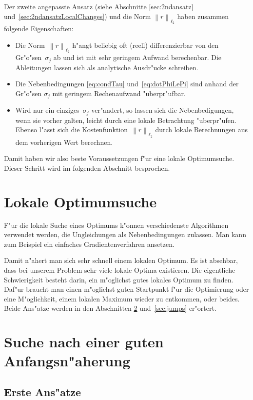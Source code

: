 \documentclass[a4paper]{scrartcl}
\newcommand{\norm}[1]{{\left\lVert#1\right\rVert}}
\begin{document}
Der zweite angepasste Ansatz (siehe Abschnitte \ref{sec:2ndansatz} und~\ref{sec:2ndansatzLocalChanges}) und die Norm $\norm{r}_{\ell_2}$ haben zusammen folgende Eigenschaften:
\begin{itemize}
  \item Die Norm~$\norm{r}_{\ell_2}$ h"angt beliebig oft (reell) differenzierbar von den Gr"o"sen~$\sigma_j$ ab und ist mit sehr geringem Aufwand berechenbar. 
  Die Ableitungen lassen sich als analytische Ausdr"ucke schreiben.
  \item Die Nebenbedingungen \eqref{eq:condTau} und~\eqref{eq:dotPhiLePi} sind anhand der Gr"o"sen $\sigma_j$ mit geringem Rechenaufwand "uberpr"ufbar. 
  \item Wird nur ein einziges~$\sigma_j$ ver"andert, so lassen sich die Nebenbedigungen, wenn sie vorher galten, leicht durch eine lokale Betrachtung "uberpr"ufen. 
  Ebenso l"asst sich die Kostenfunktion~$\norm{r}_{\ell_2}$ durch lokale Berechnungen aus dem vorherigen Wert berechnen. 
\end{itemize}
Damit haben wir also beste Voraussetzungen f"ur eine lokale Optimumsuche. 
Dieser Schritt wird im folgenden Abschnitt besprochen. 


\section{Lokale Optimumsuche} \label{sec:gradients}

F"ur die lokale Suche eines Optimums k"onnen verschiedenste Algorithmen verwendet werden, die Ungleichungen als Nebenbedingungen zulassen. 
Man kann zum Beispiel ein einfaches Gradientenverfahren ansetzen. 

Damit n"ahert man sich sehr schnell einem lokalen Optimum. 
Es ist absehbar, dass bei unserem Problem sehr viele lokale Optima existieren. 
Die eigentliche Schwierigkeit besteht darin, ein m"oglichst gutes lokales Optimum zu finden. 
Daf"ur braucht man einen m"oglichst guten Startpunkt f"ur die Optimierung oder eine M"oglichkeit, einem lokalen Maximum wieder zu entkommen, oder beides. 
Beide Ans"atze werden in den Abschnitten \ref{sec:initialval} und~\ref{sec:jumps} er"ortert. 


\section{Suche nach einer guten Anfangsn"aherung} \label{sec:initialval}

\subsection{Erste Ans"atze}
\end{document}
